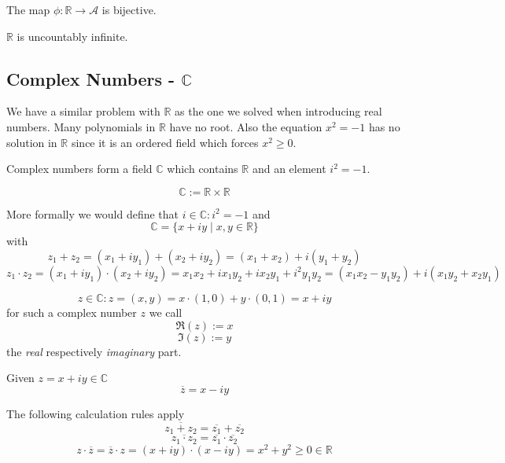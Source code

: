 \begin{theorem}\label{thm:decimal_map}
   The map \(\phi: \mathbb{R} \to \mathcal{A}\) is bijective.
\end{theorem}

\begin{proposition}[\(|\mathbb{R}| = \infty\)]\label{pro:R_uncountable}
   \(\mathbb{R}\) is uncountably infinite.
\end{proposition}

\subsection{Complex Numbers - \texorpdfstring{\(\mathbb{C}\)}{C}}
We have a similar problem with \(\mathbb{R}\) as the one we solved when introducing real numbers.
Many polynomials in \(\mathbb{R}\) have no root.
Also the equation \(x^2 = -1\) has no solution in \(\mathbb{R}\) since it is an ordered field which forces \(x^2 \geq 0\).

Complex numbers form a field \(\mathbb{C}\) which contains \(\mathbb{R}\) and an element \(i^2 = -1\).

\begin{definition}
   \[\mathbb{C} :=  \mathbb{R} \times \mathbb{R}\]
\end{definition}
\begin{remark}
   More formally we would define that \(i \in \mathbb{C}: i^2 = -1\) and
   \[\mathbb{C} = \{x + iy \mid x, y \in \mathbb{R}\}\]
   with
   \[z_1 + z_2 = (x_1 + iy_1) + (x_2 + iy_2) = (x_1 + x_2) + i(y_1 + y_2)\]
   \[z_1 \cdot z_2 = (x_1 + iy_1) \cdot (x_2 + iy_2) = x_1x_2 + ix_1y_2 + ix_2y_1 + i^2y_1y_2 = (x_1x_2 - y_1y_2) + i(x_1y_2 + x_2y_1)\]

   \[z \in \mathbb{C}: z = (x, y) = x \cdot (1, 0) + y \cdot (0, 1) = x + iy\]
   for such a complex number \(z\) we call
   \[\Re(z) := x\]
   \[\Im(z) := y\]
   the \emph{real} respectively \emph{imaginary} part.
\end{remark}

\begin{definition}
   Given \(z = x + iy \in \mathbb{C}\)
   \[\overline{z} = x - iy\]
\end{definition}
\begin{remark}
   The following calculation rules apply
   \[\overline{z_1 + z_2} = \overline{z_1} + \overline{z_2}\]
   \[\overline{z_1 \cdot z_2} = \overline{z_1} \cdot \overline{z_2}\]
   \[z \cdot \overline{z} = \overline{z} \cdot z = (x+iy) \cdot (x-iy) = x^2 + y^2 \geq 0 \in \mathbb{R}\]
\end{remark}

